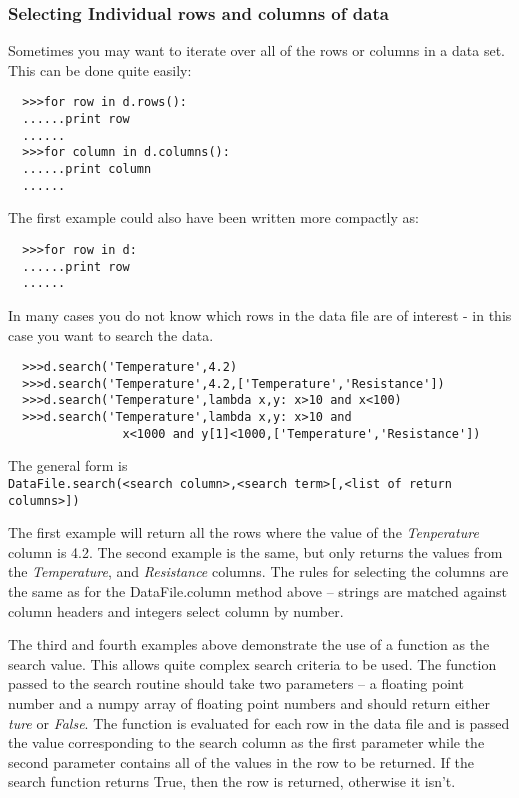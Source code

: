 \documentclass[a4paper,11pt]{scrartcl}
\begin{document}
\subsubsection{Selecting Individual rows and columns of data}

Sometimes you may want to iterate over all of the rows or columns in a data set. This can be done quite easily:
\begin{verbatim}
  >>>for row in d.rows():
  ......print row
  ......
  >>>for column in d.columns():
  ......print column
  ......
\end{verbatim}
The first example could also have been written more compactly as:
\begin{verbatim}
  >>>for row in d:
  ......print row
  ......
\end{verbatim}

In many cases you do not know which rows in the data file are of interest - in this case you want to search the data.
\begin{verbatim}
  >>>d.search('Temperature',4.2)
  >>>d.search('Temperature',4.2,['Temperature','Resistance'])
  >>>d.search('Temperature',lambda x,y: x>10 and x<100)
  >>>d.search('Temperature',lambda x,y: x>10 and
                x<1000 and y[1]<1000,['Temperature','Resistance'])
\end{verbatim}
The general form is \\\verb:DataFile.search(<search column>,<search term>[,<list of return columns>]):

The first example will return all the rows where the value of the \textit{Tenperature} column is 4.2. The second example is the same, but only returns the values from the \textit{Temperature}, and \textit{Resistance} columns. The rules for selecting the columns are the same as for the DataFile.column method above -- strings are matched against column headers and integers select column by number.

The third and fourth examples above demonstrate the use of a function as the search value. This allows quite complex search criteria to be used. The function passed to the search routine should take two parameters -- a floating point number and a numpy array of floating point numbers and should return either \textit{ture} or \textit{False}. The function is evaluated for each row in the data file and is passed the value corresponding to the search column as the first parameter while the second parameter contains all of the values in the row to be returned. If the search function returns True, then the row is returned, otherwise it isn't.
\end{document}
